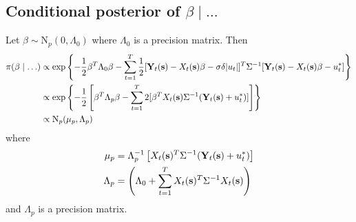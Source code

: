 \subsection*{Conditional posterior of $\beta \mid \ldots$}\label{s:betapost}
Let $\beta \sim \mbox{N}_{p}(0, \Lambda_0)$ where $\Lambda_0$ is a precision matrix. Then 
\begin{align*}
    \pi(\beta \mid \ldots) & \propto \exp \left\{ - \frac{ 1 }{ 2 } \beta^T \Lambda_0 \beta - \sum_{t = 1 }^T \frac{ 1 }{ 2 } [\mbox{\bf Y}_t(\mbox{\bf s}) - X_t(\mbox{\bf s}) \beta - \sigma \delta |u_t|]^T \Sigma^{-1} [\mbox{\bf Y}_t(\mbox{\bf s}) - X_t(\mbox{\bf s}) \beta - u^*_t] \right\}\\
     & \propto \exp \left\{ -\frac{ 1 }{ 2 } \left[ \beta^T \Lambda_p \beta  - \sum_{ t = 1 }^T 2 [ \beta^T X_t(\mbox{\bf s}) \Sigma^{-1} (\mbox{\bf Y}_t(\mbox{\bf s}) + u^*_t )] \right] \right\}\\
     & \propto \mbox{N}_p ( \mu_p , \Lambda_p)
\end{align*}
where
\begin{align*}
    \mu_p &= \Lambda_p^{-1} \left[ X_t(\mbox{\bf s})^T \Sigma^{-1} (\mbox{\bf Y}_t(\mbox{\bf s}) + u^*_t) \right]\\
    \Lambda_p &= \left (\Lambda_0 + \sum_{ t = 1 }^{ T} X_t(\mbox{\bf s})^T \Sigma^{-1} X_t(\mbox{\bf s}) \right)
\end{align*}
and $\Lambda_p$ is a precision matrix.